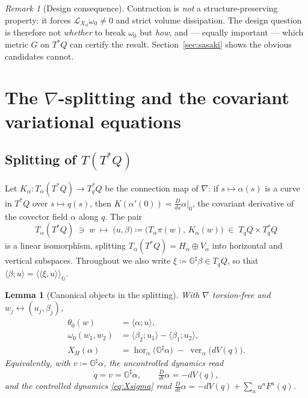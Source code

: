 \documentclass[11pt,a4paper]{article}
\newcommand{\Gm}{\mathbb{G}}                      %
\newcommand{\ipG}[2]{\langle\!\langle #1 , #2 \rangle\!\rangle_{\Gm}}
\newcommand{\dpair}[2]{\langle #1 ; #2 \rangle}   %
\newcommand{\Gsharp}{\Gm^{\sharp}}
\newcommand{\hor}{\operatorname{hor}}
\newcommand{\ver}{\operatorname{ver}}
\newcommand{\Lie}{\mathcal{L}}
\newcommand{\Tstar}{T^{*}Q}
\newcommand{\Dt}{\tfrac{D}{dt}}
\theoremstyle{plain}
\newtheorem{lemma}[theorem]{Lemma}
\theoremstyle{definition}
\theoremstyle{remark}
\newtheorem{remark}[theorem]{Remark}
\begin{document}
\begin{remark}[Design consequence]
\label{rem:design}
Contraction is \emph{not} a structure-preserving property: it forces
$\Lie_{X_{\mathrm{cl}}}\omega_0 \ne 0$ and strict volume dissipation. The design
question is therefore not \emph{whether} to break $\omega_0$ but \emph{how}, and
--- equally important --- which metric $G$ on $\Tstar$ can certify the result.
Section~\ref{sec:sasaki} shows the obvious candidates cannot.
\end{remark}

\section{The \texorpdfstring{$\nabla$}{nabla}-splitting and the covariant variational equations}
\label{sec:splitting}

\subsection{Splitting of \texorpdfstring{$T(\Tstar)$}{T(T*Q)}}

Let $K_\alpha : T_\alpha(\Tstar) \to T^{*}_qQ$ be the connection map of $\nabla$:
if $s \mapsto \alpha(s)$ is a curve in $\Tstar$ over $s \mapsto q(s)$, then
$K(\alpha'(0)) = \tfrac{D}{ds}\alpha\big|_{0}$, the covariant derivative of the
covector field $\alpha$ along $q$. The pair
\begin{equation}
  T_\alpha(\Tstar) \;\ni\; w \;\longmapsto\;
  \big(u,\beta\big) \coloneqq \big(T_\alpha\pi(w),\, K_\alpha(w)\big)
  \;\in\; T_qQ \times T^{*}_qQ
  \label{eq:splitting}
\end{equation}
is a linear isomorphism, splitting $T_\alpha(\Tstar) = H_\alpha \oplus V_\alpha$
into horizontal and vertical subspaces. Throughout we also write
$\xi \coloneqq \Gsharp\beta \in T_qQ$, so that
$\dpair{\beta}{u} = \ipG{\xi}{u}$.

\begin{lemma}[Canonical objects in the splitting]
\label{lem:splitting}
With $\nabla$ torsion-free and $w_j \leftrightarrow (u_j,\beta_j)$,
\begin{align}
  \theta_0(w) &= \dpair{\alpha}{u}, \label{eq:theta-split}\\
  \omega_0(w_1,w_2) &= \dpair{\beta_2}{u_1} - \dpair{\beta_1}{u_2},
     \label{eq:omega-split}\\
  X_H(\alpha) &= \hor_\alpha\!\big(\Gsharp\alpha\big) \;-\; \ver_\alpha\!\big(dV(q)\big).
     \label{eq:XH-split}
\end{align}
Equivalently, with $v \coloneqq \Gsharp\alpha$, the uncontrolled dynamics read
\begin{equation}
  \dot q = v = \Gsharp\alpha,
  \qquad
  \Dt \alpha = -dV(q),
  \label{eq:ham-covariant}
\end{equation}
and the controlled dynamics \eqref{eq:Xsigma} read
$\Dt\alpha = -dV(q) + \sum_a u^a F^a(q)$.
\end{lemma}
\end{document}
